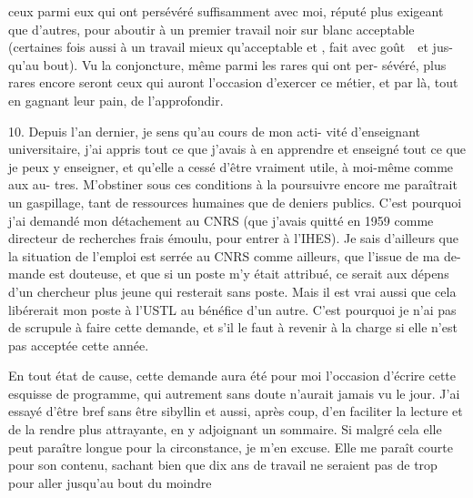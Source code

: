 
ceux parmi eux qui ont persévéré suffisamment avec moi, réputé
plus exigeant que d'autres, pour aboutir à un premier travail
noir sur blanc acceptable (certaines fois aussi à un travail mieux
qu'acceptable et , fait avec goût\ \ et jus-%
qu'au bout). Vu la conjoncture, même parmi les rares qui ont per-%
sévéré, plus rares encore seront ceux qui auront l'occasion
d'exercer ce métier, et par là, tout en gagnant leur pain, de
l'approfondir.

10. Depuis l'an dernier, je sens qu'au cours de mon acti-%
vité d'enseignant universitaire, j'ai appris tout ce que j'avais
à en apprendre et enseigné tout ce que je peux y enseigner, et
qu'elle a cessé d'être vraiment utile, à moi-même comme aux au-%
tres. M'obstiner sous ces conditions à la poursuivre encore me
paraîtrait un gaspillage, tant de ressources humaines que de deniers
publics. C'est pourquoi j'ai demandé mon détachement au CNRS (que
j'avais quitté en 1959 comme directeur de recherches frais émoulu,
pour entrer à l'IHES). Je sais d'ailleurs que la situation de
l'emploi est serrée au CNRS comme ailleurs, que l'issue de ma de-%
mande est douteuse, et que si un poste m'y était attribué, ce serait
aux dépens d'un chercheur plus jeune qui resterait sans poste.
Mais il est vrai aussi que cela libérerait mon poste à l'USTL au
bénéfice d'un autre. C'est pourquoi je n'ai pas de scrupule à
faire cette demande, et s'il le faut à revenir à la charge si elle
n'est pas acceptée cette année.

En tout état de cause, cette demande aura été pour moi
l'occasion d'écrire cette esquisse de programme, qui autrement sans
doute n'aurait jamais vu le jour. J'ai essayé d'être bref sans être
sibyllin et aussi, après coup, d'en faciliter la lecture et de
la rendre plus attrayante, en y adjoignant un sommaire. Si malgré
cela elle peut paraître longue pour la circonstance, je m'en excuse.
Elle me paraît courte pour son contenu, sachant bien que dix ans de
travail ne seraient pas de trop pour aller jusqu'au bout du moindre

